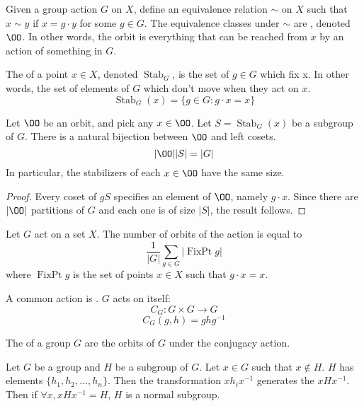 \documentclass{article}
\begin{document}
\begin{defn}
  Given a group action $G$ on $X$, define an equivalence relation $\sim$ on $X$ such that
  $x \sim y$ if $x = g \cdot y$ for some $g \in G$. The equivalence classes under $\sim$ are
  , denoted $\OO$. In other words, the orbit is everything that can be reached
  from $x$ by an action of something in $G$. 
\end{defn}

\begin{defn}
  The  of a point $x \in X$, denoted $\operatorname{Stab}_G$, is
  the set of $g \in G$ which fix x. In other words, the set of elements of $G$ which don't
  move when they act on $x$.
  $$\operatorname{Stab}_G(x) = \{g \in G : g \cdot x = x\}$$
\end{defn}

\begin{nthm}
  Let $\OO$ be an orbit, and pick any $x \in \OO$. Let $S = \operatorname{Stab}_G(x)$
  be a subgroup of $G$. There is a natural bijection between $\OO$ and left cosets.
  $$|\OO||S| = |G|$$
  In particular, the stabilizers of each $x \in \OO$ have the same size. 
\end{nthm}

\begin{proof}
  Every coset of $gS$ specifies an element of $\OO$, namely $g \cdot x$. Since
  there are $|\OO|$ partitions of $G$ and each one is of size $|S|$,
  the result follows.   
\end{proof}

\begin{nthm}
  Let $G$ act on a set $X$. The number of orbits of the action is equal to
  $$\frac{1}{|G|} \sum\limits_{g \in G} |\operatorname{FixPt} g|$$
  where $\operatorname{FixPt} g$ is the set of points $x \in X$ such that
  $g \cdot x = x$. 
\end{nthm}

\begin{defn}
  A common action is . $G$ acts on itself:
  $$C_G : G \times G \rightarrow G$$
  $$C_G(g, h) = ghg^{-1}$$
\end{defn}

\begin{defn}
  The  of a group $G$ are the orbits of $G$ under the
  conjugacy action. 
\end{defn}

\begin{defn}
  Let $G$ be a group and $H$ be a subgroup of $G$. Let $x \in G$ such that $x \not\in H$.
  $H$ has elements $\{h_1, h_2, ..., h_n\}$. Then the transformation $xh_ix^{-1}$ generates
  the  $xHx^{-1}$.
  Then if $\forall x, xHx^{-1} = H$, $H$ is a normal subgroup.
\end{defn}
\end{document}
